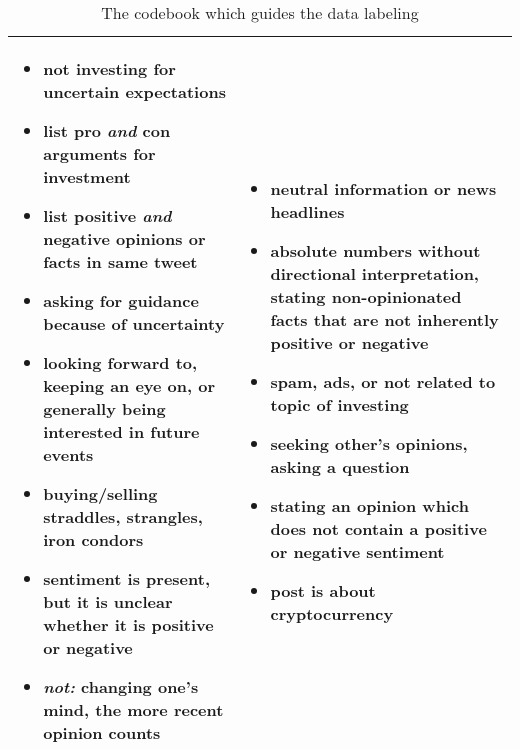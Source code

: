 \begin{table}[!ht]
\begin{tabular}{p{7.5cm}p{7.5cm}}
\begin{itemize}[noitemsep,leftmargin=*,topsep=-12pt]
	\item not investing for uncertain expectations
	\item list pro \emph{and} con arguments for investment
	\item list positive \emph{and} negative opinions or facts in same tweet
	\item asking for guidance because of uncertainty
	\item looking forward to, keeping an eye on, or generally being interested in future events
	\item buying/selling straddles, strangles, iron condors
	\item sentiment is present, but it is unclear whether it is positive or negative
	\item \emph{not:} changing one's mind, the more recent opinion counts

\end{itemize} & \begin{itemize}[noitemsep,leftmargin=*,topsep=-12pt]
	\item neutral information or news headlines
	\item absolute numbers without directional interpretation, stating non-opinionated facts that are not inherently positive or negative
	\item spam, ads, or not related to topic of investing
	\item seeking other's opinions, asking a question
	\item stating an opinion which does not contain a positive or negative sentiment
	\item post is about cryptocurrency
\end{itemize}\\

\bottomrule
\end{tabular}
\caption{The codebook which guides the data labeling}
\label{table-codebook}
\end{table}